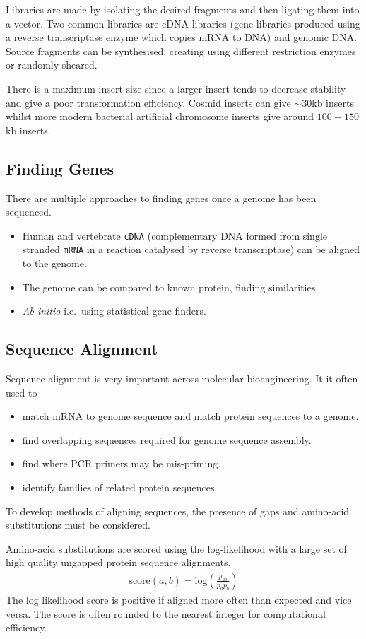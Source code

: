\documentclass[a4paper]{article}
\newcommand{\ix}[1]{%
  \leavevmode %
  \marginpar{\small\emph{#1}}%
}
\begin{document}
Libraries are made\ix{Production} by isolating the desired fragments and then ligating them into a vector. Two common libraries are cDNA libraries (gene libraries produced using a reverse transcriptase enzyme which copies mRNA to DNA) and genomic DNA. Source fragments can be synthesised, creating using different restriction enzymes or randomly sheared.

There is a maximum insert size since a larger insert tends to decrease stability and give a poor transformation efficiency. Cosmid inserts can give $\sim 30$kb inserts whilst more modern bacterial artificial chromosome inserts give around $100-150$kb inserts.

\subsection{Finding Genes}
There are multiple approaches to finding genes once a genome has been sequenced.\ix{Approaches}
\begin{itemize}
\item Human and vertebrate \texttt{cDNA} (complementary DNA formed from single stranded \texttt{mRNA} in a reaction catalysed by reverse transcriptase) can be aligned to the genome.
\item The genome can be compared to known protein, finding similarities.
\item \emph{Ab initio} i.e.\ using statistical gene finders.
\end{itemize}

\subsection*{Sequence Alignment}
Sequence alignment is very important across molecular bioengineering.\ix{Why important?} It it often used to
\begin{itemize}
\item match mRNA to genome sequence and match protein sequences to a genome.
\item find overlapping sequences required for genome sequence assembly.
\item find where PCR primers may be mis-priming.
\item identify families of related protein sequences.
\end{itemize}

To develop methods of aligning sequences, the presence of gaps and amino-acid substitutions must be considered.

Amino-acid substitutions are scored using the log-likelihood with a large set of high quality ungapped protein sequence alignments.
\begin{align*}
\text{score}(a, b) = \text{log}(\frac{p_{ab}}{p_a p_b})
\end{align*}
The log likelihood score is positive if aligned more often than expected and vice versa. The score is often rounded to the nearest integer for computational efficiency.
\end{document}
